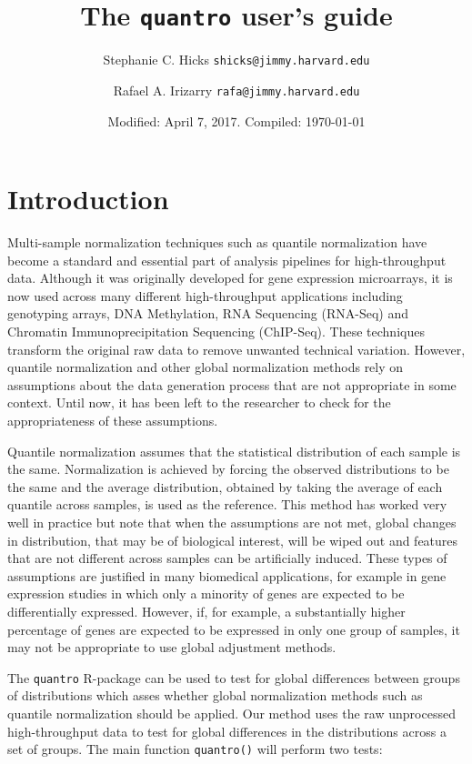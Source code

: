 \documentclass{article}\usepackage[]{graphicx}\usepackage[usenames,dvipsnames]{color}
\title{The \texttt{quantro} user's guide}
\author{Stephanie C. Hicks \texttt{shicks@jimmy.harvard.edu} \and
Rafael A. Irizarry \texttt{rafa@jimmy.harvard.edu} }
\date{Modified: April 7, 2017.  Compiled: \today}
\begin{document}
\maketitle
 
\tableofcontents

\section{Introduction}

Multi-sample normalization techniques such as quantile normalization 
\cite{Bolstad2003, Irizarry2003} have become a standard and essential part of 
analysis pipelines for high-throughput data. Although it was originally 
developed for gene expression microarrays, it is now used across many 
different high-throughput applications including genotyping arrays, DNA 
Methylation, RNA Sequencing (RNA-Seq) and Chromatin Immunoprecipitation 
Sequencing (ChIP-Seq). These techniques transform the original raw data to 
remove unwanted technical variation. However, quantile normalization and other 
global normalization methods rely on assumptions about the data generation 
process that are not appropriate in some context. Until now, it has been left 
to the researcher to check for the appropriateness of these assumptions. 

Quantile normalization assumes that the statistical distribution of each 
sample is the same. Normalization is achieved by forcing the observed 
distributions to be the same and the average distribution, obtained by taking 
the average of each quantile across samples, is used as the reference. This 
method has worked very well in practice but note that when the assumptions are 
not met, global changes in distribution, that may be of biological interest, 
will be wiped out and features that are not different across samples can be 
artificially induced.  These types of assumptions are justified in many 
biomedical applications, for example in gene expression studies in which only 
a minority of genes are expected to be differentially expressed. However, if, 
for example, a substantially higher percentage of genes are expected to be 
expressed in only one group of samples, it may not be appropriate to use 
global adjustment methods. 

The \texttt{quantro} R-package can be used to test for global differences 
between groups of distributions which asses whether global normalization 
methods such as quantile normalization should be applied. Our method uses 
the raw unprocessed high-throughput data to test for global differences in 
the distributions across a set of groups. The main function \texttt{quantro()} 
will perform two tests: 
\end{document}
